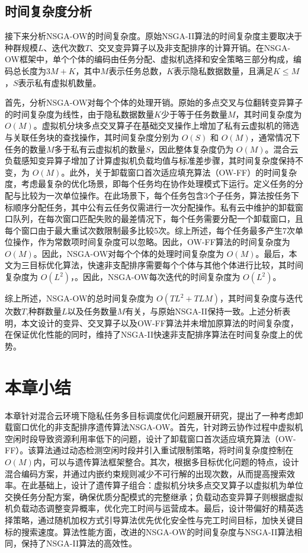 \subsection{时间复杂度分析}

接下来分析NSGA-OW的时间复杂度。原始NSGA-II算法的时间复杂度主要取决于种群规模\(L\)、迭代次数\(T\)、交叉变异算子以及非支配排序的计算开销。在NSGA-OW框架中，单个个体的编码由任务分配、虚拟机选择和安全策略三部分构成，编码总长度为\(3M + K\)，其中\(M\)表示任务总数，\(K\)表示隐私数据数量，且满足\(K \le M\)，\(S\)表示私有虚拟机数量。

首先，分析NSGA-OW对每个个体的处理开销。原始的多点交叉与位翻转变异算子的时间复杂度为线性，由于隐私数据数量\(K\)少于等于任务数量\(M\)，其时间复杂度为 \(O(M)\)。虚拟机分块多点交叉算子在基础交叉操作上增加了私有云虚拟机的筛选与关联任务块的查找操作，其时间复杂度分别为 \(O(S)\) 和 \(O(M)\)，通常情况下任务的数量\(M\)多于私有云虚拟机的数量\(S\)，因此整体复杂度仍为 \(O(M)\)。混合云负载感知变异算子增加了计算虚拟机负载均值与标准差步骤，其时间复杂度保持不变，为 \(O(M)\)。此外，关于卸载窗口首次适应填充算法（OW-FF）的时间复杂度，考虑最复杂的优化场景，即每个任务均在协作处理模式下运行。定义任务的分配与比较为一次单位操作。在此场景下，每个任务包含3个子任务，算法按任务下标顺序分配任务，其中公有云任务仅需进行一次分配操作。私有云中维护的卸载窗口队列，在每次窗口匹配失败的最差情况下，每个任务需要分配一个卸载窗口，且每个窗口由于最大重试次数限制最多比较5次。综上所述，每个任务最多产生7次单位操作，作为常数项时间复杂度可以忽略。因此，OW-FF算法的时间复杂度为 \( O(M) \)。因此，NSGA-OW对每个个体的处理时间复杂度为 \(O(M)\)。最后，本文为三目标优化算法，快速非支配排序需要每个个体与其他个体进行比较，其时间复杂度为 \(O(L^2)\)，。因此，NSGA-OW每次迭代的时间复杂度为 \(O(L^2)\)。

综上所述，NSGA-OW的总时间复杂度为 \(O(TL^2 + TLM)\)，其时间复杂度与迭代次数\(T\),种群数量\(L\)以及任务数量\(M\)有关，与原始NSGA-II保持一致。上述分析表明，本文设计的变异、交叉算子以及OW-FF算法并未增加原算法的时间复杂度，在保证优化性能的同时，维持了NSGA-II快速非支配排序算法在时间复杂度上的优势。

\section{本章小结}

本章针对混合云环境下隐私任务多目标调度优化问题展开研究，提出了一种考虑卸载窗口优化的非支配排序遗传算法NSGA-OW。首先，针对跨云协作过程中虚拟机空闲时段导致资源利用率低下的问题，设计了卸载窗口首次适应填充算法（OW-FF）。该算法通过动态检测空闲时段并引入重试限制策略，将时间复杂度控制在\( O(M) \)内，可以与遗传算法框架整合。其次，根据多目标优化问题的特点，设计混合编码方案，并通过内嵌约束规则减少不可行解的出现次数，从而提高搜索效率。在此基础上，设计了遗传算子组合：虚拟机分块多点交叉算子以虚拟机为单位交换任务分配方案，确保优质分配模式的完整继承；负载动态变异算子则根据虚拟机负载动态调整变异概率，优化完工时间与运营成本。最后，设计带偏好的精英选择策略，通过随机加权方式引导算法优先优化安全性与完工时间目标，加快关键目标的搜索速度。算法性能方面，改进的NSGA-OW的时间复杂度与NSGA-II算法相同，保持了NSGA-II算法的高效性。

